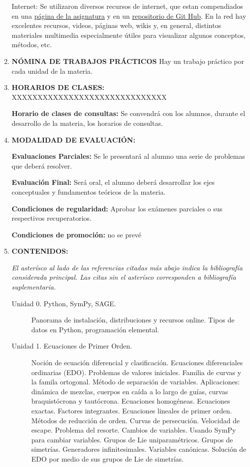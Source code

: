 \documentclass[12pt]{article}
\begin{document}
\begin{enumerate}
		  Internet:  Se utilizaron diversos recursos de internet, que estan compendiados en una \href{http://fdmazzone.github.io/Ecuaciones_Diferenciales/}{página de la asignatura} y en un \href{https://github.com/fdmazzone/Ecuaciones_Diferenciales}{repositorio de Git Hub}.  En la red  hay excelentes recursos, videos, páginas web, wikis  y, en general, distintos materiales multimedia especialmente útiles para visualizar algunos conceptos, métodos, etc.

 \item\textbf{  NÓMINA DE TRABAJOS PRÁCTICOS}
		Hay un trabajo práctico por cada unidad de la materia.

\item\textbf{   HORARIOS DE CLASES:}
	XXXXXXXXXXXXXXXXXXXXXXXXXXXXXX

 \textbf{  Horario de clases de consultas:}
	Se convendrá con los alumnos, durante el desarrollo de la materia,
  los horarios de consultas.


\item\textbf{   MODALIDAD DE EVALUACIÓN:}

\textbf{Evaluaciones Parciales:}  Se le presentará al alumno una serie de problemas que deberá resolver.

\textbf{Evaluación Final:} Será oral, el alumno deberá desarrollar los ejes conceptuales y fundamentos teóricos de la materia.

\textbf{  Condiciones de regularidad:}
Aprobar los exámenes parciales o sus respectivos recuperatorios.

\textbf{  Condiciones de promoción:} no se prevé

\item\textbf{ CONTENIDOS:}

\emph{
El asterísco al lado de las referencias citadas más abajo indica la bibliografía considerada principal. Las citas sin el asterísco corresponden a bibliografía suplementaria.}

\begin{description}
 \item[Unidad 0. Python, SymPy, SAGE.] Panorama de instalación, distribuciones y recursos online. Tipos de datos en Python, programación elemental.

\item[Unidad 1. Ecuaciones de Primer Orden.]  Noción de ecuación diferencial y clasificación. Ecuaciones diferenciales ordinarias (EDO).   Problemas de valores iniciales. Familia de curvas y la famila ortogonal. Método de separación de variables. Aplicaciones: dinámica de mezclas, cuerpos en caída a lo largo de guías, curvas braquistócrona y tautócrona. Ecuaciones homogéneas. Ecuaciones exactas. Factores integrantes. Ecuaciones lineales de primer orden. Métodos de reducción de orden. Curvas de persecución. Velocidad de escape. Problema del resorte. Cambios de variables. Usando SymPy para cambiar variables.  Grupos de Lie uniparamétricos. Grupos de simetrías. Generadores infinitesimales. Variables canónicas. Solución de EDO por medio de sus grupos de Lie de simetrías.


\end{description}
\end{enumerate}
\end{document}
